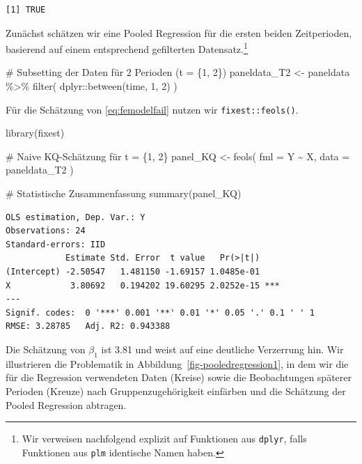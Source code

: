 \documentclass[
  a4paper,
  DIV=11,
  oneside]{scrreprt}
\newenvironment{Shaded}{\begin{snugshade}}{\end{snugshade}}
\newcommand{\AttributeTok}[1]{\textcolor[rgb]{0.40,0.45,0.13}{#1}}
\newcommand{\CommentTok}[1]{\textcolor[rgb]{0.37,0.37,0.37}{#1}}
\newcommand{\DecValTok}[1]{\textcolor[rgb]{0.68,0.00,0.00}{#1}}
\newcommand{\FunctionTok}[1]{\textcolor[rgb]{0.28,0.35,0.67}{#1}}
\newcommand{\NormalTok}[1]{\textcolor[rgb]{0.00,0.23,0.31}{#1}}
\newcommand{\OtherTok}[1]{\textcolor[rgb]{0.00,0.23,0.31}{#1}}
\newcommand{\SpecialCharTok}[1]{\textcolor[rgb]{0.37,0.37,0.37}{#1}}
\begin{document}
\begin{verbatim}
[1] TRUE
\end{verbatim}

Zunächst schätzen wir eine Pooled Regression für die ersten beiden
Zeitperioden, basierend auf einem entsprechend gefilterten
Datensatz.\footnote{Wir verweisen nachfolgend explizit auf Funktionen
  aus \texttt{dplyr}, falls Funktionen aus \texttt{plm} identische Namen
  haben.}

\begin{Shaded}
\begin{Highlighting}[]
\CommentTok{\# Subsetting der Daten für 2 Perioden (t = \{1, 2\})}
\NormalTok{paneldata\_T2 }\OtherTok{\textless{}{-}}\NormalTok{ paneldata }\SpecialCharTok{\%\textgreater{}\%} 
  \FunctionTok{filter}\NormalTok{(}
\NormalTok{    dplyr}\SpecialCharTok{::}\FunctionTok{between}\NormalTok{(time, }\DecValTok{1}\NormalTok{, }\DecValTok{2}\NormalTok{)}
\NormalTok{  )}
\end{Highlighting}
\end{Shaded}

Für die Schätzung von \eqref{eq:femodelfail} nutzen wir
\texttt{fixest::feols()}.

\begin{Shaded}
\begin{Highlighting}[]
\FunctionTok{library}\NormalTok{(fixest)}

\CommentTok{\# Naive KQ{-}Schätzung für t = \{1, 2\}}
\NormalTok{panel\_KQ }\OtherTok{\textless{}{-}} \FunctionTok{feols}\NormalTok{(}
  \AttributeTok{fml =}\NormalTok{ Y }\SpecialCharTok{\textasciitilde{}}\NormalTok{ X, }
  \AttributeTok{data =}\NormalTok{ paneldata\_T2}
\NormalTok{)}

\CommentTok{\# Statistische Zusammenfassung}
\FunctionTok{summary}\NormalTok{(panel\_KQ)}
\end{Highlighting}
\end{Shaded}

\begin{verbatim}
OLS estimation, Dep. Var.: Y
Observations: 24
Standard-errors: IID 
            Estimate Std. Error  t value   Pr(>|t|)    
(Intercept) -2.50547   1.481150 -1.69157 1.0485e-01    
X            3.80692   0.194202 19.60295 2.0252e-15 ***
---
Signif. codes:  0 '***' 0.001 '**' 0.01 '*' 0.05 '.' 0.1 ' ' 1
RMSE: 3.28785   Adj. R2: 0.943388
\end{verbatim}

Die Schätzung von \(\beta_1\) ist 3.81 und weist auf eine deutliche
Verzerrung hin. Wir illustrieren die Problematik in
Abbildung~\ref{fig-pooledregression1}, in dem wir die für die Regression
verwendeten Daten (Kreise) sowie die Beobachtungen späterer Perioden
(Kreuze) nach Gruppenzugehörigkeit einfärben und die Schätzung der
Pooled Regression abtragen.
\end{document}
